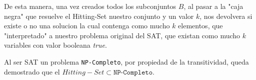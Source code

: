 De esta manera, una vez creados todos los subconjuntos $B$, al pasar a la "caja negra" que resuelve el Hitting-Set nuestro conjunto y un valor $k$, nos devolvera si existe o no una solucion la cual contenga como mucho $k$ elementos, que "interpretado" a nuestro problema original del SAT, que existan como mucho $k$ variables con valor booleana \textit{true}.

Al ser SAT un problema \texttt{NP-Completo}, por propiedad de la transitividad, queda demostrado que el $Hitting-Set \subset \texttt{NP-Completo}$.